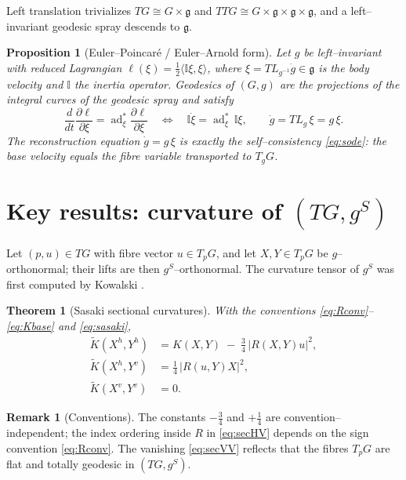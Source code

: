 \documentclass[11pt]{article}
\theoremstyle{definition}
\newtheorem{remark}[definition]{Remark}
\theoremstyle{plain}
\newtheorem{theorem}[definition]{Theorem}
\newtheorem{proposition}[definition]{Proposition}
\newcommand{\g}{\mathfrak{g}}
\newcommand{\Sec}{K}
\newcommand{\Sect}{\widetilde{K}}
\newcommand{\ad}{\operatorname{ad}}
\newcommand{\hor}[1]{#1^{h}}
\newcommand{\ver}[1]{#1^{v}}
\newcommand{\inner}[2]{\langle #1, #2\rangle}
\newcommand{\TG}{TG}
\newcommand{\TTG}{TTG}
\newcommand{\gS}{g^{S}}
\begin{document}
Left translation trivializes $\TG\cong G\times\g$ and $\TTG\cong G\times\g\times\g\times\g$,
and a left--invariant geodesic spray descends to $\g$.

\begin{proposition}[Euler--Poincar\'e / Euler--Arnold form]\label{prop:EP}
Let $g$ be left--invariant with reduced Lagrangian
$\ell(\xi)=\tfrac12\inner{\mathbb{I}\xi}{\xi}$, where $\xi=T L_{g^{-1}}\dot g\in\g$ is the
body velocity and $\mathbb{I}$ the inertia operator. Geodesics of $(G,g)$ are the
projections of the integral curves of the geodesic spray and satisfy
\begin{equation}\label{eq:EP}
  \frac{d}{dt}\frac{\partial\ell}{\partial\xi}
  =\ad^{*}_{\xi}\frac{\partial\ell}{\partial\xi}
  \quad\Longleftrightarrow\quad
  \mathbb{I}\dot\xi=\ad^{*}_{\xi}\,\mathbb{I}\xi,
  \qquad
  \dot g = T L_g\,\xi = g\,\xi .
\end{equation}
The reconstruction equation $\dot g=g\,\xi$ is exactly the self--consistency
\eqref{eq:sode}: the base velocity equals the fibre variable transported to $T_gG$.
\end{proposition}

\section{Key results: curvature of $(\TG,\gS)$}\label{sec:curvature}

Let $(p,u)\in\TG$ with fibre vector $u\in T_pG$, and let $X,Y\in T_pG$ be $g$--orthonormal;
their lifts are then $\gS$--orthonormal. The curvature tensor of $\gS$ was first computed
by Kowalski \cite{Kowalski1971}.

\begin{theorem}[Sasaki sectional curvatures]\label{thm:sasaki-sec}
With the conventions \eqref{eq:Rconv}--\eqref{eq:Kbase} and \eqref{eq:sasaki},
\begin{align}
  \Sect(\hor{X},\hor{Y})
    &= \Sec(X,Y)\;-\;\tfrac34\,\bigl|R(X,Y)u\bigr|^{2},
      \label{eq:secHH}\\[2pt]
  \Sect(\hor{X},\ver{Y})
    &= \tfrac14\,\bigl|R(u,Y)X\bigr|^{2},
      \label{eq:secHV}\\[2pt]
  \Sect(\ver{X},\ver{Y})
    &= 0 .
      \label{eq:secVV}
\end{align}
\end{theorem}

\begin{remark}[Conventions]\label{rem:conv}
The constants $-\tfrac34$ and $+\tfrac14$ are convention--independent; the index ordering
inside $R$ in \eqref{eq:secHV} depends on the sign convention \eqref{eq:Rconv}. The
vanishing \eqref{eq:secVV} reflects that the fibres $T_pG$ are flat and totally geodesic in
$(\TG,\gS)$.
\end{remark}
\end{document}
